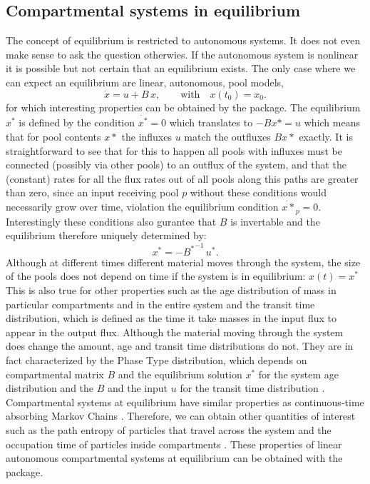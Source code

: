 \subsection{Compartmental systems in equilibrium} \label{sec:Equilibrium}
The concept of equilibrium is restricted to autonomous systems. It does not even make sense to ask the question otherwies. 
If the autonomous system is nonlinear it is possible but not certain that an
equilibrium exists. The only case where we can expect an equilibrium are
linear, autonomous, pool models, 
\begin{equation} \label{eq:LS}
\dot{x} = u + B \, x, \qquad  \mathrm{with} \quad x(t_0) = x_0.
\end{equation}
for which interesting properties can be
obtained by the \LAPM package.  The equilibrium $x^*$ is defined by the
condition  $\dot{x^*}=0$ which translates to $-B x*=u$ which means that for
pool contents $x*$ the influxes $u$ match the outfluxes $B x*$ exactly.  It is
straightforward to see that for this to happen all 
pools with influxes must be connected (possibly via other pools) to an outflux of
the system, and that the (constant) rates for all the flux rates out of all
pools along this paths are greater than zero, since an input receiving pool $p$
without these conditions would necessarily grow over time, violation the
equilibrium condition $\dot{x*}_p=0$. Interestingly these conditions also
gurantee that $B$ is invertable and the equilibrium therefore uniquely
determined by: 
\begin{equation} 
\label{eq:x_Binv_u}
x^* = - {B^*}^{-1} \, u^*.  
\end{equation}
Although at different times different material moves through the system, the
size of the pools does not depend on time if the system is in
equilibrium: $x(t)=x^*$ 
This is also true for other properties such as the
age distribution of mass in particular compartments and in the entire system
and the transit time distribution, which is defined as the time it take masses
in the input flux to appear in the output flux.  Although the material moving
through the system does change the amount, age and transit
time distributions do not.  They are in fact characterized by the Phase Type
distribution, which depends on compartmental matrix $B$ and the equilibrium
solution $x^*$ for the system age distribution and the $B$ and the input $u$
for the transit time distribution \citep{Metzler2018MGS}.
Compartmental systems at equilibrium have similar properties as continuous-time absorbing Markov Chains \citep{Metzler2018MGS}. Therefore, we can obtain other quantities of interest such as  the path entropy of particles that travel across the system and the occupation time of particles inside compartments \citep{Metzler2020}. These properties of linear autonomous compartmental systems at equilibrium can be obtained with the \LAPM package.

